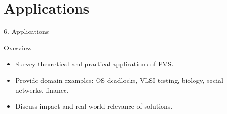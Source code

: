 \documentclass[aspectratio=169]{beamer}
\newcommand{\fvs}{\textsc{FVS}}
\begin{document}
\section{Applications}

\begin{frame}{6. Applications}
	\begin{block}{Overview}
		\begin{itemize}
			\item Survey theoretical and practical applications of \fvs.
			\item Provide domain examples: OS deadlocks, VLSI testing, biology, social networks, finance.
			\item Discuss impact and real-world relevance of solutions.
		\end{itemize}
	\end{block}
\end{frame}
\end{document}
